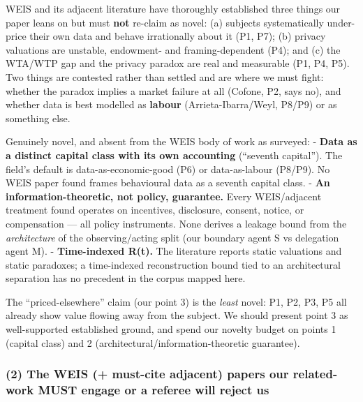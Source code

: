 \documentclass[
  11pt,
]{article}
\begin{document}
WEIS and its adjacent literature have thoroughly established three
things our paper leans on but must \textbf{not} re-claim as novel: (a)
subjects systematically under-price their own data and behave
irrationally about it (P1, P7); (b) privacy valuations are unstable,
endowment- and framing-dependent (P4); and (c) the WTA/WTP gap and the
privacy paradox are real and measurable (P1, P4, P5). Two things are
contested rather than settled and are where we must fight: whether the
paradox implies a market failure at all (Cofone, P2, says no), and
whether data is best modelled as \textbf{labour} (Arrieta-Ibarra/Weyl,
P8/P9) or as something else.

Genuinely novel, and absent from the WEIS body of work as surveyed: -
\textbf{Data as a distinct capital class with its own accounting}
(``seventh capital''). The field's default is data-as-economic-good (P6)
or data-as-labour (P8/P9). No WEIS paper found frames behavioural data
as a seventh capital class. - \textbf{An information-theoretic, not
policy, guarantee.} Every WEIS/adjacent treatment found operates on
incentives, disclosure, consent, notice, or compensation --- all policy
instruments. None derives a leakage bound from the \emph{architecture}
of the observing/acting split (our boundary agent S vs delegation agent
M). - \textbf{Time-indexed R(t).} The literature reports static
valuations and static paradoxes; a time-indexed reconstruction bound
tied to an architectural separation has no precedent in the corpus
mapped here.

The ``priced-elsewhere'' claim (our point 3) is the \emph{least} novel:
P1, P2, P3, P5 all already show value flowing away from the subject. We
should present point 3 as well-supported established ground, and spend
our novelty budget on points 1 (capital class) and 2
(architectural/information-theoretic guarantee).

\subsubsection{(2) The WEIS (+ must-cite adjacent) papers our
related-work MUST engage or a referee will reject
us}\label{the-weis-must-cite-adjacent-papers-our-related-work-must-engage-or-a-referee-will-reject-us}
\end{document}
